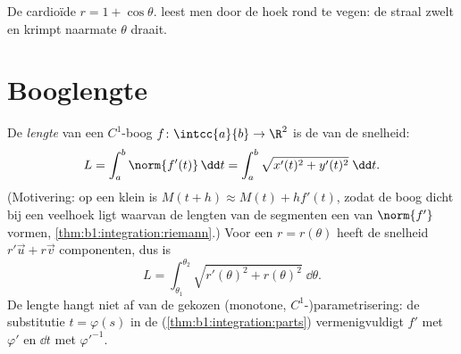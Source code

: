 \begin{omfigure}

{\small De cardioïde $r = 1 + \cos\theta$.  leest men
door de hoek rond te vegen: de straal zwelt en krimpt naarmate
$\theta$ draait.}
\end{omfigure}

\section{Booglengte}

\begin{definition}\label{def:b1:curves:arclength}
De \emph{lengte} van een $C^1$-boog $f \colon
\intcc{a}{b} \to \R^2$ is de  van de snelheid:
\[
L = \int_a^b \norm{f'(t)}\,\dd t
= \int_a^b \sqrt{x'(t)^2 + y'(t)^2}\;\dd t .
\]
(Motivering: op een klein  is $M(t + h) \approx M(t) + h
f'(t)$, zodat de boog dicht bij een veelhoek ligt waarvan de
lengten van de segmenten een  van $\norm{f'}$ vormen,
\cref{thm:b1:integration:riemann}.) Voor een  $r =
r(\theta)$ heeft de snelheid $r'\vec u + r\vec v$ 
componenten, dus is
\[
L = \int_{\theta_1}^{\theta_2}
\sqrt{r'(\theta)^2 + r(\theta)^2}\;\dd\theta .
\]
De lengte hangt niet af van de gekozen (monotone,
$C^1$-)parametrisering: de substitutie $t = \varphi(s)$ in de
 (\cref{thm:b1:integration:parts}) vermenigvuldigt $f'$
met $\varphi'$ en $\dd t$ met $\varphi'^{-1}$.
\end{definition}

